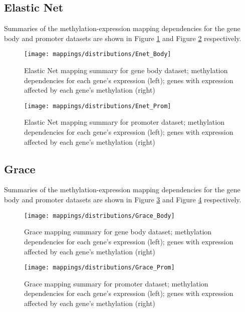 \subsection{Elastic Net}
Summaries of the methylation-expression mapping dependencies for the gene body and promoter datasets are shown in Figure \ref{fig:map_body_enet} and Figure \ref{fig:map_prom_enet} respectively.
\begin{figure}[H]
	\centering
	\texttt{[image: mappings/distributions/Enet\_Body]}
	\caption{Elastic Net mapping summary for gene body dataset; methylation dependencies for each gene's expression (left); genes with expression affected by each gene's methylation (right)}
	\label{fig:map_body_enet}
\end{figure}
\begin{figure}[H]
	\centering
	\texttt{[image: mappings/distributions/Enet\_Prom]}
	\caption{Elastic Net mapping summary for promoter dataset; methylation dependencies for each gene's expression (left); genes with expression affected by each gene's methylation (right)}
	\label{fig:map_prom_enet}
\end{figure}
\pagebreak


\subsection{Grace}
Summaries of the methylation-expression mapping dependencies for the gene body and promoter datasets are shown in Figure \ref{fig:map_body_grace} and Figure \ref{fig:map_prom_grace} respectively.
\begin{figure}[H]
	\centering
	\texttt{[image: mappings/distributions/Grace\_Body]}
	\caption{Grace mapping summary for gene body dataset; methylation dependencies for each gene's expression (left); genes with expression affected by each gene's methylation (right)}
	\label{fig:map_body_grace}
\end{figure}
\begin{figure}[H]
	\centering
	\texttt{[image: mappings/distributions/Grace\_Prom]}
	\caption{Grace mapping summary for promoter dataset; methylation dependencies for each gene's expression (left); genes with expression affected by each gene's methylation (right)}
	\label{fig:map_prom_grace}
\end{figure}
\pagebreak



